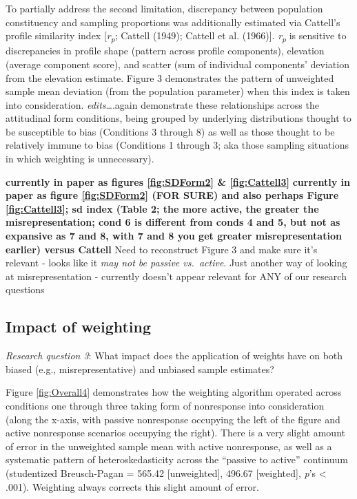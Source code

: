 \documentclass[
  man,mask]{apa7}
\begin{document}
To partially address the second limitation, discrepancy between population constituency and sampling proportions was additionally estimated via Cattell's profile similarity index {[}\emph{r\textsubscript{p}}; Cattell (1949); Cattell et al. (1966){]}. \emph{r\textsubscript{p}} is sensitive to discrepancies in profile shape (pattern across profile components), elevation (average component score), and scatter (sum of individual components' deviation from the elevation estimate. Figure 3 demonstrates the pattern of unweighted sample mean deviation (from the population parameter) when this index is taken into consideration. \emph{edits}\ldots.again demonstrate these relationships across the attitudinal form conditions, being grouped by underlying distributions thought to be susceptible to bias (Conditions 3 through 8) as well as those thought to be relatively immune to bias (Conditions 1 through 3; aka those sampling situations in which weighting is unnecessary).

\textbf{currently in paper as figures \ref{fig:SDForm2} \& \ref{fig:Cattell3}} \textbf{currently in paper as figure \ref{fig:SDForm2} (FOR SURE) and also perhaps Figure \ref{fig:Cattell3}; sd index (Table 2; the more active, the greater the misrepresentation; cond 6 is different from conds 4 and 5, but not as expansive as 7 and 8, with 7 and 8 you get greater misrepresentation earlier) versus Cattell} Need to reconstruct Figure 3 and make sure it's relevant - looks like it \emph{may not be passive vs.~active}. Just another way of looking at misrepresentation - currently doesn't appear relevant for ANY of our research questions

\hypertarget{impact-of-weighting}{%
\subsection{Impact of weighting}\label{impact-of-weighting}}

\emph{Research question 3}: What impact does the application of weights have on both biased (e.g., misrepresentative) and unbiased sample estimates?

Figure \ref{fig:Overall4} demonstrates how the weighting algorithm operated across conditions one through three taking form of nonresponse into consideration (along the x-axis, with passive nonresponse occupying the left of the figure and active nonresponse scenarios occupying the right). There is a very slight amount of error in the unweighted sample mean with active nonresponse, as well as a systematic pattern of heteroskedasticity across the ``passive to active'' continuum (studentized Breusch-Pagan = 565.42 {[}unweighted{]}, 496.67 {[}weighted{]}, \emph{p}'s \textless{} .001). Weighting always corrects this slight amount of error.
\end{document}
